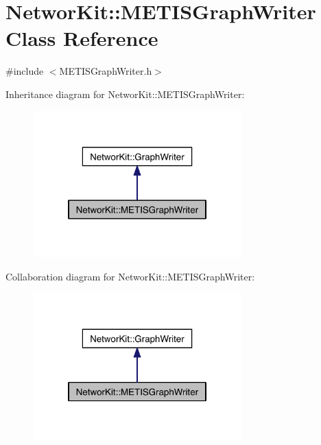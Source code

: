 \hypertarget{class_networ_kit_1_1_m_e_t_i_s_graph_writer}{\section{Networ\-Kit\-:\-:M\-E\-T\-I\-S\-Graph\-Writer Class Reference}
\label{class_networ_kit_1_1_m_e_t_i_s_graph_writer}
}


{\ttfamily \#include $<$M\-E\-T\-I\-S\-Graph\-Writer.\-h$>$}



Inheritance diagram for Networ\-Kit\-:\-:M\-E\-T\-I\-S\-Graph\-Writer\-:\nopagebreak
\begin{figure}[H]
\begin{center}
\leavevmode
\includegraphics[width=228pt]{class_networ_kit_1_1_m_e_t_i_s_graph_writer__inherit__graph}
\end{center}
\end{figure}


Collaboration diagram for Networ\-Kit\-:\-:M\-E\-T\-I\-S\-Graph\-Writer\-:\nopagebreak
\begin{figure}[H]
\begin{center}
\leavevmode
\includegraphics[width=228pt]{class_networ_kit_1_1_m_e_t_i_s_graph_writer__coll__graph}
\end{center}
\end{figure}
